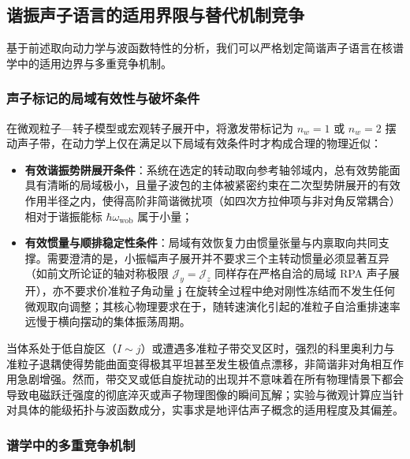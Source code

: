 \subsection{谐振声子语言的适用界限与替代机制竞争}\label{sec:3-4-4}

基于前述取向动力学与波函数特性的分析，我们可以严格划定简谐声子语言在核谱学中的适用边界与多重竞争机制。

\subsubsection{声子标记的局域有效性与破坏条件}

在微观粒子—转子模型或宏观转子展开中，将激发带标记为 $n_w = 1$ 或 $n_w = 2$ 摆动声子带，在动力学上仅在满足以下局域有效条件时才构成合理的物理近似：
\begin{itemize}
\item \textbf{有效谐振势阱展开条件}：系统在选定的转动取向参考轴邻域内，总有效势能面具有清晰的局域极小，且量子波包的主体被紧密约束在二次型势阱展开的有效作用半径之内，使得高阶非简谐微扰项（如四次方拉伸项与非对角反常耦合）相对于谐振能标 $\hbar \omega_{\text{wob}}$ 属于小量；
\item \textbf{有效惯量与顺排稳定性条件}：局域有效恢复力由惯量张量与内禀取向共同支撑。需要澄清的是，小振幅声子展开并不要求三个主转动惯量必须显著互异（如前文所论证的轴对称极限 $\mathcal{J}_y = \mathcal{J}_z$ 同样存在严格自洽的局域 RPA 声子展开），亦不要求价准粒子角动量 $\mathbf{j}$ 在旋转全过程中绝对刚性冻结而不发生任何微观取向调整；其核心物理要求在于，随转速演化引起的准粒子自洽重排速率远慢于横向摆动的集体振荡周期。
\end{itemize}

当体系处于低自旋区（$I \sim j$）或遭遇多准粒子带交叉区时，强烈的科里奥利力与准粒子退耦使得势能曲面变得极其平坦甚至发生极值点漂移，非简谐非对角相互作用急剧增强。然而，带交叉或低自旋扰动的出现并不意味着在所有物理情景下都会导致电磁跃迁强度的彻底淬灭或声子物理图像的瞬间瓦解；实验与微观计算应当针对具体的能级拓扑与波函数成分，实事求是地评估声子概念的适用程度及其偏差。

\subsubsection{谱学中的多重竞争机制}


